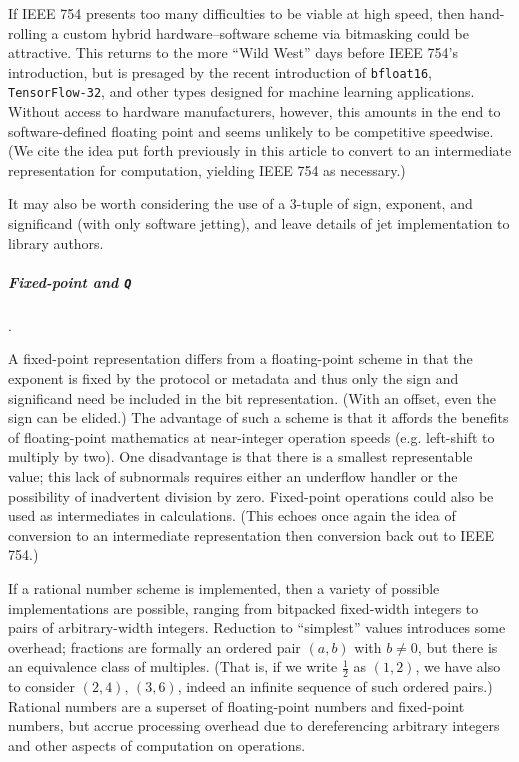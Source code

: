 \documentclass[twoside]{article}
\begin{document}
If IEEE 754 presents too many difficulties to be viable at high speed, then hand-rolling a custom hybrid hardware–software scheme via bitmasking could be attractive.  This returns to the more “Wild West” days before IEEE 754's introduction, but is presaged by the recent introduction of \texttt{bfloat16}, \texttt{TensorFlow-32}, and other types designed for machine learning applications.  Without access to hardware manufacturers, however, this amounts in the end to software-defined floating point and seems unlikely to be competitive speedwise.  (We cite the idea put forth previously in this article to convert to an intermediate representation for computation, yielding IEEE 754 as necessary.)

It may also be worth considering the use of a 3-tuple of sign, exponent, and significand (with only software jetting), and leave details of jet implementation to library authors.

\subparagraph{Fixed-point and \texttt{Q}}.

A fixed-point representation differs from a floating-point scheme in that the exponent is fixed by the protocol or metadata and thus only the sign and significand need be included in the bit representation.  (With an offset, even the sign can be elided.)  The advantage of such a scheme is that it affords the benefits of floating-point mathematics at near-integer operation speeds (e.g. left-shift to multiply by two).  One disadvantage is that there is a smallest representable value; this lack of subnormals requires either an underflow handler or the possibility of inadvertent division by zero.  Fixed-point operations could also be used as intermediates in calculations.  (This echoes once again the idea of conversion to an intermediate representation then conversion back out to IEEE 754.)

If a rational number scheme is implemented, then a variety of possible implementations are possible, ranging from bitpacked fixed-width integers to pairs of arbitrary-width integers.  Reduction to “simplest” values introduces some overhead; fractions are formally an ordered pair $(a, b)$ with $b \neq 0$, but there is an equivalence class of multiples.  (That is, if we write $\frac{1}{2}$ as $(1, 2)$, we have also to consider $(2, 4)$, $(3, 6)$, indeed an infinite sequence of such ordered pairs.)  Rational numbers are a superset of floating-point numbers and fixed-point numbers, but accrue processing overhead due to dereferencing arbitrary integers and other aspects of computation on operations.
\end{document}
